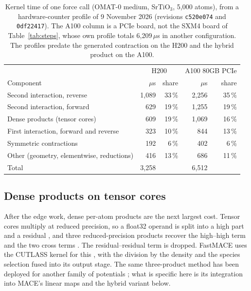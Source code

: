 \documentclass[11pt]{article}
\newcommand{\us}{\,\ensuremath{\mu}s}
\begin{document}
\begin{table}[t]
\centering
\small
\begin{tabular}{lrrrr}
\toprule
 & \multicolumn{2}{c}{H200} & \multicolumn{2}{c}{A100 80GB PCIe} \\
Component & $\mu$s & share & $\mu$s & share \\
\midrule
Second interaction, reverse  & 1{,}089 & 33\,\% & 2{,}256 & 35\,\% \\
Second interaction, forward  &   629 & 19\,\% & 1{,}255 & 19\,\% \\
Dense products (tensor cores) &  609 & 19\,\% & 1{,}069 & 16\,\% \\
First interaction, forward and reverse & 323 & 10\,\% & 844 & 13\,\% \\
Symmetric contractions       &   192 &  6\,\% &   402 &  6\,\% \\
Other (geometry, elementwise, reductions) & 416 & 13\,\% & 686 & 11\,\% \\
\midrule
Total                        & 3{,}258 &  & 6{,}512 & \\
\bottomrule
\end{tabular}
\caption{Kernel time of one force call (OMAT-0 medium, SrTiO$_3$, 5{,}000 atoms), from a hardware-counter
profile of 9 November 2026 (revisions \texttt{c520e074} and \texttt{0df22417}). The A100 column is a PCIe
board, not the SXM4 board of Table~\ref{tab:steps}, whose own profile totals 6{,}209\us{} in another
configuration. The profiles predate the generated contraction on the H200 and the hybrid product on the A100.}
\label{tab:profile}
\end{table}

\subsection{Dense products on tensor cores}
\label{sec:gemm}

After the edge work, dense per-atom products are the next largest cost. Tensor cores multiply at reduced
precision, so a float32 operand is split into a high part and a residual \cite{markidis2018tensorcores}, and
three reduced-precision products recover the high--high term and the two cross terms \cite{ootomo2022tf32}. The residual--residual term is
dropped. FastMACE uses the CUTLASS kernel for this \cite{cutlass}, with the division by the density and the
species selection fused into its output stage. The same three-product method has been deployed for another
family of potentials \cite{nvidia2026tf32x3}; what is specific here is its integration into MACE's linear maps
and the hybrid variant below.
\end{document}
